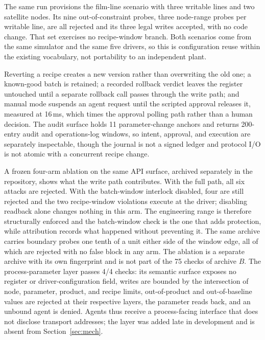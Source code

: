 The same run provisions the film-line scenario with three writable lines and two
satellite nodes. Its nine out-of-constraint probes, three node-range probes per writable line, are all rejected and its three legal writes accepted, with no code change. That set exercises no recipe-window branch. Both scenarios come from the same
simulator and the same five drivers, so this is configuration reuse within the
existing vocabulary, not portability to an independent plant.

Reverting a recipe creates a
new version rather than overwriting the old one; a known-good batch is retained; a
recorded rollback verdict leaves the register untouched until a separate rollback
call passes through the write path; and manual mode suspends an agent request until
the scripted approval releases it, measured at 16\,ms, which times the approval polling path rather than a human decision. The audit
surface holds 11 parameter-change anchors and returns 200-entry audit and
operations-log windows, so intent, approval, and execution are separately
inspectable, though the journal is not a signed ledger and protocol I/O is not
atomic with a concurrent recipe change.

A frozen four-arm ablation on the same API surface, archived separately in the repository, shows what the write path contributes. With the full path, all six attacks are rejected. With the batch-window interlock disabled, four are still rejected and the two recipe-window violations execute at the driver; disabling readback alone changes nothing in this arm. The engineering range is therefore structurally enforced and the batch-window check is the one that adds protection, while attribution records what happened without preventing it. The same archive carries boundary probes one tenth of a unit either side of the window edge, all of which are rejected with no false block in any arm. The ablation is a separate archive with its own fingerprint and is not part of the 75 checks of archive $B$. The process-parameter layer passes 4/4 checks: its semantic surface exposes no
register or driver-configuration field, writes are bounded by the intersection of
node, parameter, product, and recipe limits, out-of-product and out-of-baseline
values are rejected at their respective layers, the parameter reads back, and an
unbound agent is denied. Agents thus receive a process-facing interface that does
not disclose transport addresses; the layer was added late in development and is
absent from Section~\ref{sec:mech}.

